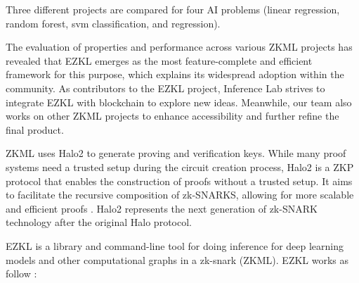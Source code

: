 \documentclass[conference]{IEEEtran}
\begin{document}
Three different projects are compared for four AI problems (linear regression, random forest, svm classification, and regression).



The evaluation of properties and performance across various ZKML projects has revealed that EZKL emerges as the most feature-complete and efficient framework for this purpose, which explains its widespread adoption within the community. As contributors to the EZKL project, Inference Lab strives to integrate EZKL with blockchain to explore new ideas. Meanwhile, our team also works on other ZKML projects to enhance accessibility and further refine the final product.

ZKML uses Halo2 to generate proving and verification keys. While many proof systems need a trusted setup during the circuit creation process, Halo2 is a ZKP protocol that enables the construction of proofs without a trusted setup. It aims to facilitate the recursive composition of zk-SNARKS, allowing for more scalable and efficient proofs . Halo2 represents the next generation of zk-SNARK technology after the original Halo protocol. 

EZKL is a library and command-line tool for doing inference for deep learning models and other computational graphs in a zk-snark (ZKML). EZKL works as follow :
\end{document}
